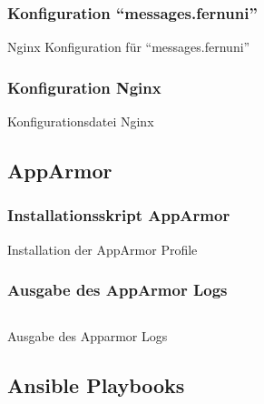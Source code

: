 \subsubsection{Konfiguration \enquote{messages.fernuni}}
\begin{longlisting}
    \caption{Nginx Konfiguration für \enquote{messages.fernuni}}
\end{longlisting}

\subsubsection{Konfiguration Nginx}
\begin{longlisting}
    \caption{Konfigurationsdatei Nginx}
\end{longlisting}

\subsection{AppArmor}
\subsubsection{Installationsskript AppArmor}

\begin{longlisting}{}
    \caption{Installation der AppArmor Profile}
    \label{listing:installation_apparmor}
\end{longlisting}

\subsubsection{Ausgabe des AppArmor Logs}

\begin{longlisting}
    \inputminted[fontfamily=tt,
    linenos=true,
    numberblanklines=true,
    numbersep=5pt,
    gobble=0,
    frame=leftline,
    framerule=0.4pt,
    framesep=2mm,
    funcnamehighlighting=true,
    tabsize=4,
    obeytabs=false,
    mathescape=false
    samepage=false, %
    showspaces=false,
    showtabs =false,
    texcl=false,
    breaklines=true,
    lastline=10]{text}{code/shell/apparmor.log}
    \caption{Ausgabe des Apparmor Logs}
    \label{listing:log_apparmor}
\end{longlisting}
\newpage
\subsection{Ansible Playbooks}

